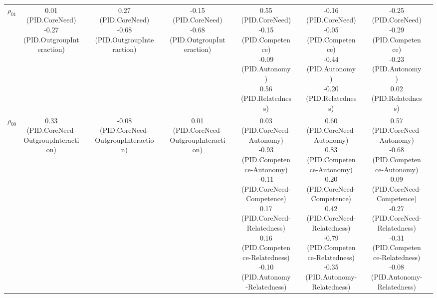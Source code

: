 \begin{landscape}
\begin{table}
\begin{minipage}[t][\textheight][t]{\textwidth}
{\begin{tabular}[t]{lcccccccccccc}
\hspace{1em}$\rho_{01}$ & \makecell[c]{ 0.01 (PID.CoreNeed)\\-0.27 (PID.OutgroupInteraction)} &  & \makecell[c]{ 0.27 (PID.CoreNeed)\\-0.68 (PID.OutgroupInteraction)} &  & \makecell[c]{-0.15 (PID.CoreNeed)\\-0.68 (PID.OutgroupInteraction)} &  & \makecell[c]{ 0.55 (PID.CoreNeed)\\-0.15 (PID.Competence)\\-0.09 (PID.Autonomy)\\ 0.56 (PID.Relatedness)} &  & \makecell[c]{-0.16 (PID.CoreNeed)\\-0.05 (PID.Competence)\\-0.44 (PID.Autonomy)\\-0.20 (PID.Relatedness)} &  & \makecell[c]{-0.25 (PID.CoreNeed)\\-0.29 (PID.Competence)\\-0.23 (PID.Autonomy)\\ 0.02 (PID.Relatedness)} & \\
\hspace{1em}$\rho_{00}$ & 0.33 (PID.CoreNeed-OutgroupInteraction) &  & -0.08 (PID.CoreNeed-OutgroupInteraction) &  & 0.01 (PID.CoreNeed-OutgroupInteraction) &  & \makecell[r]{ 0.03 (PID.CoreNeed-Autonomy)\\-0.93 (PID.Competence-Autonomy)\\-0.11 (PID.CoreNeed-Competence)\\ 0.17 (PID.CoreNeed-Relatedness)\\ 0.16 (PID.Competence-Relatedness)\\-0.10 (PID.Autonomy-Relatedness)} &  & \makecell[r]{ 0.60 (PID.CoreNeed-Autonomy)\\ 0.83 (PID.Competence-Autonomy)\\ 0.20 (PID.CoreNeed-Competence)\\ 0.42 (PID.CoreNeed-Relatedness)\\-0.79 (PID.Competence-Relatedness)\\-0.35 (PID.Autonomy-Relatedness)} &  & \makecell[r]{ 0.57 (PID.CoreNeed-Autonomy)\\-0.68 (PID.Competence-Autonomy)\\ 0.09 (PID.CoreNeed-Competence)\\-0.27 (PID.CoreNeed-Relatedness)\\-0.31 (PID.Competence-Relatedness)\\-0.08 (PID.Autonomy-Relatedness)} & \\

\end{tabular}}
\end{minipage}
\end{table}
\end{landscape}
